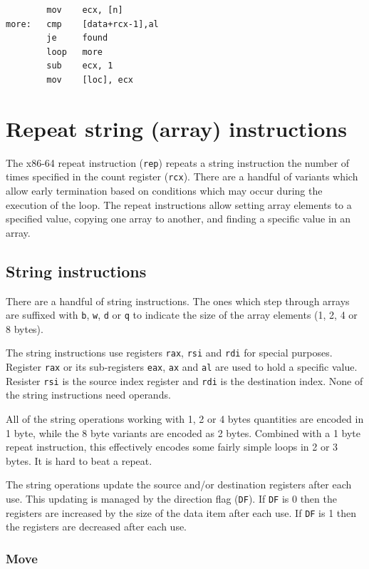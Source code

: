 \documentclass[11pt,b5paper]{book}
\begin{document}
\begin{verbatim}
        mov    ecx, [n]
more:   cmp    [data+rcx-1],al
        je     found
        loop   more
        sub    ecx, 1
        mov    [loc], ecx
\end{verbatim}


\section{Repeat string (array) instructions}

The x86-64 repeat instruction ({\tt rep}) repeats a string instruction the number of times specified  
in the count register ({\tt rcx}).
There are a handful of variants which allow early termination based on conditions which may occur during the execution of the loop.
The repeat instructions allow setting array elements to a specified value, copying one array to another, and
finding a specific value in an array.

\subsection{String instructions}

There are a handful of string instructions.
The ones which step through arrays are suffixed with {\tt b}, {\tt w}, {\tt d} or {\tt q} to indicate the size
of the array elements (1, 2, 4 or 8 bytes).

The string instructions use registers {\tt rax}, {\tt rsi} and {\tt rdi} for special purposes.
Register {\tt rax} or its sub-registers {\tt eax}, {\tt ax} and {\tt al} are used to hold a specific value.
Resister {\tt rsi} is the source index register and {\tt rdi} is the destination index.
None of the string instructions need operands.

All of the string operations working with 1, 2 or 4 bytes quantities are encoded in 1 byte, while the 8 byte variants are encoded as 2 bytes.
Combined with a 1 byte repeat instruction, this effectively encodes some fairly simple loops in 2 or 3 bytes.
It is hard to beat a repeat.

The string operations update the source and/or destination registers after each use.
This updating is managed by the direction flag ({\tt DF}).
If {\tt DF} is 0 then the registers are increased by the size of the data item after each use.
If {\tt DF} is 1 then the registers are decreased after each use.

\subsubsection{Move}
\end{document}
